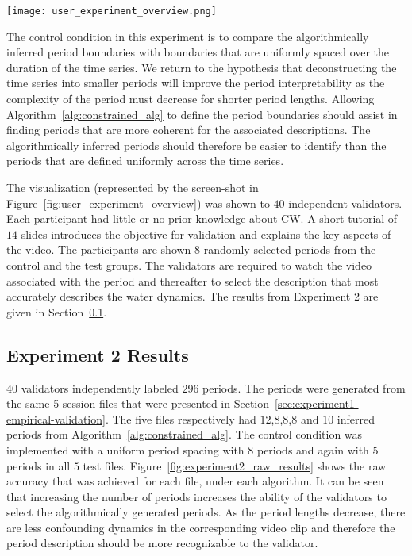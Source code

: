 \begin{sidewaysfigure}
\texttt{[image: user\_experiment\_overview.png]}
\caption{Screen-shot of the user interface designed to evaluate the interpretability of Algorithm~\ref{alg:constrained_alg}. The video representation at (1) is played for the duration of the period. Three plausible descriptions (of which (2) is one of these) are presented and the validator is asked to select the description that best describes the dynamics shown in the video. In this case, \textit{Description 3} is the correct solution.}
\label{fig:user_experiment_overview}
\end{sidewaysfigure}

The control condition in this experiment is to compare the algorithmically inferred period boundaries with boundaries that are uniformly spaced over the duration of the time series. We return to the hypothesis that deconstructing the time series into smaller periods will improve the period interpretability as the complexity of the period must decrease for shorter period lengths. Allowing Algorithm~\ref{alg:constrained_alg} to define the period boundaries should assist in finding periods that are more coherent for the associated descriptions. The algorithmically inferred periods should therefore be easier to identify than the periods that are defined uniformly across the time series.

The visualization (represented by the screen-shot in Figure~\ref{fig:user_experiment_overview}) was shown to $40$ independent validators. Each participant had little or no prior knowledge about CW. A short tutorial of $14$ slides introduces the objective for validation and explains the key aspects of the video. The participants are shown $8$ randomly selected periods from the control and the test groups. The validators are required to watch the video associated with the period and thereafter to select the description that most accurately describes the water dynamics. The results from Experiment 2 are given in Section~\ref{sec:experiment2-empirical-validation-results}.

\subsection{Experiment 2 Results}\label{sec:experiment2-empirical-validation-results}

$40$ validators independently labeled $296$ periods. The periods were generated from the same 5 session files that were presented in Section~\ref{sec:experiment1-empirical-validation}. The five files respectively had $12$,$8$,$8$,$8$ and $10$ inferred periods from Algorithm~\ref{alg:constrained_alg}. The control condition was implemented with a uniform period spacing with $8$ periods and again with $5$ periods in all $5$ test files. Figure~\ref{fig:experiment2_raw_results} shows the raw accuracy that was achieved for each file, under each algorithm. It can be seen that increasing the number of periods increases the ability of the validators to select the algorithmically generated periods. As the period lengths decrease, there are less confounding dynamics in the corresponding video clip and therefore the period description should be more recognizable to the validator.

